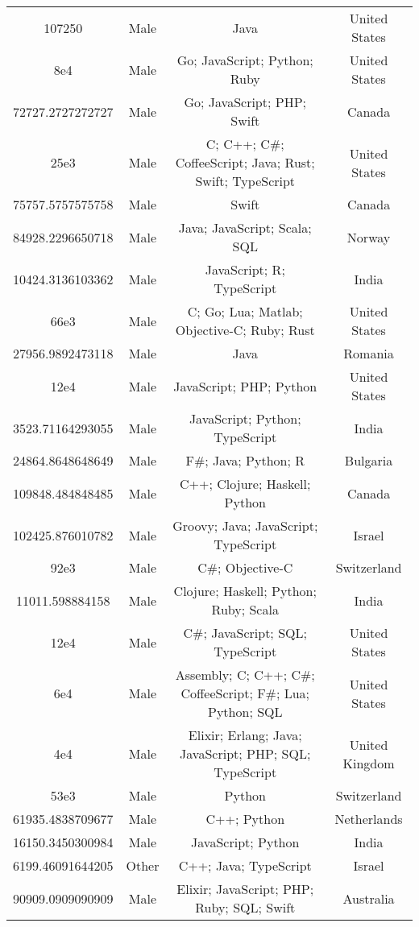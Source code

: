 \begin{center}
\begin{tabular}{ |c|c|c|c| }
107250  &  Male  &  Java  &  United States  \\ 
8e4  &  Male  &  Go; JavaScript; Python; Ruby  &  United States  \\ 
72727.2727272727  &  Male  &  Go; JavaScript; PHP; Swift  &  Canada  \\ 
25e3  &  Male  &  C; C++; C\#; CoffeeScript; Java; Rust; Swift; TypeScript  &  United States  \\ 
75757.5757575758  &  Male  &  Swift  &  Canada  \\ 
84928.2296650718  &  Male  &  Java; JavaScript; Scala; SQL  &  Norway  \\ 
10424.3136103362  &  Male  &  JavaScript; R; TypeScript  &  India  \\ 
66e3  &  Male  &  C; Go; Lua; Matlab; Objective-C; Ruby; Rust  &  United States  \\ 
27956.9892473118  &  Male  &  Java  &  Romania  \\ 
12e4  &  Male  &  JavaScript; PHP; Python  &  United States  \\ 
3523.71164293055  &  Male  &  JavaScript; Python; TypeScript  &  India  \\ 
24864.8648648649  &  Male  &  F\#; Java; Python; R  &  Bulgaria  \\ 
109848.484848485  &  Male  &  C++; Clojure; Haskell; Python  &  Canada  \\ 
102425.876010782  &  Male  &  Groovy; Java; JavaScript; TypeScript  &  Israel  \\ 
92e3  &  Male  &  C\#; Objective-C  &  Switzerland  \\ 
11011.598884158  &  Male  &  Clojure; Haskell; Python; Ruby; Scala  &  India  \\ 
12e4  &  Male  &  C\#; JavaScript; SQL; TypeScript  &  United States  \\ 
6e4  &  Male  &  Assembly; C; C++; C\#; CoffeeScript; F\#; Lua; Python; SQL  &  United States  \\ 
4e4  &  Male  &  Elixir; Erlang; Java; JavaScript; PHP; SQL; TypeScript  &  United Kingdom  \\ 
53e3  &  Male  &  Python  &  Switzerland  \\ 
61935.4838709677  &  Male  &  C++; Python  &  Netherlands  \\ 
16150.3450300984  &  Male  &  JavaScript; Python  &  India  \\ 
6199.46091644205  &  Other  &  C++; Java; TypeScript  &  Israel  \\ 
90909.0909090909  &  Male  &  Elixir; JavaScript; PHP; Ruby; SQL; Swift  &  Australia  \\ 

\end{tabular}
\end{center}
